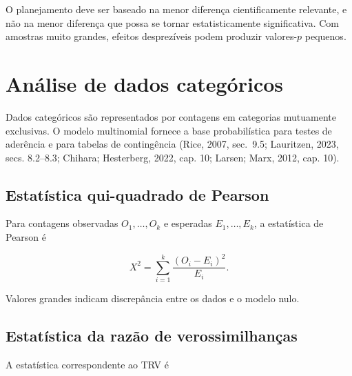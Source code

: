 \documentclass[
  letterpaper,
  DIV=11,
  numbers=noendperiod]{scrreprt}
\begin{document}
\begin{tcolorbox}[enhanced jigsaw, colback=white, leftrule=.75mm, colbacktitle=quarto-callout-important-color!10!white, breakable, titlerule=0mm, bottomtitle=1mm, title=\textcolor{quarto-callout-important-color}{\faExclamation}\hspace{0.5em}{Significância prática}, colframe=quarto-callout-important-color-frame, toprule=.15mm, opacityback=0, bottomrule=.15mm, opacitybacktitle=0.6, arc=.35mm, toptitle=1mm, rightrule=.15mm, coltitle=black, left=2mm]

O planejamento deve ser baseado na menor diferença cientificamente
relevante, e não na menor diferença que possa se tornar estatisticamente
significativa. Com amostras muito grandes, efeitos desprezíveis podem
produzir valores-\(p\) pequenos.

\end{tcolorbox}

\section{Análise de dados
categóricos}\label{anuxe1lise-de-dados-categuxf3ricos}

Dados categóricos são representados por contagens em categorias
mutuamente exclusivas. O modelo multinomial fornece a base
probabilística para testes de aderência e para tabelas de contingência
(Rice, 2007, sec.~9.5; Lauritzen, 2023, secs. 8.2--8.3; Chihara;
Hesterberg, 2022, cap. 10; Larsen; Marx, 2012, cap. 10).

\subsection{Estatística qui-quadrado de
Pearson}\label{estatuxedstica-qui-quadrado-de-pearson}

Para contagens observadas \(O_1,\ldots,O_k\) e esperadas
\(E_1,\ldots,E_k\), a estatística de Pearson é

\[X^2
=
\sum_{i=1}^k
\frac{(O_i-E_i)^2}{E_i}.\]

Valores grandes indicam discrepância entre os dados e o modelo nulo.

\subsection{Estatística da razão de
verossimilhanças}\label{estatuxedstica-da-razuxe3o-de-verossimilhanuxe7as}

A estatística correspondente ao TRV é
\end{document}
